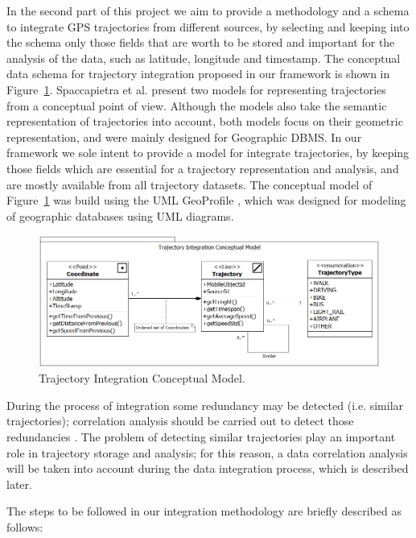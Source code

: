 \documentclass[a4paper,12pt]{article}
\begin{document}
In the second part of this project we aim to provide a methodology and a schema to integrate GPS trajectories from different sources, by selecting and keeping into the schema only those fields that are worth to be stored and important for the analysis of the data, such as latitude, longitude and timestamp. The conceptual data schema for trajectory integration proposed in our framework is shown in Figure~\ref{fig:fig2}. Spaccapietra et al. \cite{spaccapietra2008} present two models for representing trajectories from a conceptual point of view. Although the models also take the semantic representation of trajectories into account, both models focus on their geometric representation, and were mainly designed for Geographic DBMS. In our framework we sole intent to provide a model for integrate trajectories, by keeping those fields which are essential for a trajectory representation and analysis, and are mostly available from all trajectory datasets. The conceptual model of Figure~\ref{fig:fig2} was build using the UML GeoProfile \cite{sampaio2010}, which was designed for modeling of geographic databases using UML diagrams.

\begin{figure}[htb]
\centering
\includegraphics[width=1\textwidth]{integration_model}
\caption{Trajectory Integration Conceptual Model.}
\label{fig:fig2}
\end{figure}

During the process of integration some redundancy may be detected (i.e. similar trajectories); correlation analysis should be carried out to detect those redundancies \cite{han2011}. The problem of detecting similar trajectories play an important role in trajectory storage and analysis; for this reason, a data correlation analysis will be taken into account during the data integration process, which is described later.

The steps to be followed in our integration methodology are briefly described as follows:
\end{document}
